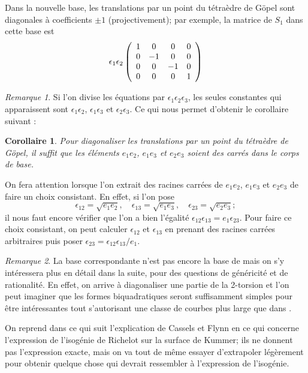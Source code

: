 \documentclass[a4paper,12pt]{article}
\newtheorem{corollaire}[theoreme]{Corollaire}
\theoremstyle{definition}
\theoremstyle{remark}
\newtheorem{remarque}{Remarque}
\numberwithin{equation}{section}
\begin{document}
Dans la nouvelle base, les translations par un point du tétraèdre de G\"opel sont diagonales à coefficients $\pm 1$ (projectivement); par exemple, la matrice de $S_1$ dans cette base est
\[ \epsilon_1\epsilon_2
\left(
  \begin{array}{ c c c c}
     1 & 0 & 0  & 0  \\
     0 & -1   & 0  & 0  \\
     0 & 0   & -1  & 0 \\
     0 & 0   & 0  & 1  \\
  \end{array} \right)
\]

\begin{remarque}
Si l'on divise les équations par $\epsilon_1\epsilon_2\epsilon_3$, les seules constantes qui apparaissent sont $\epsilon_1\epsilon_2$, $\epsilon_1\epsilon_3$ et $\epsilon_2\epsilon_3$. Ce qui nous permet d'obtenir le corollaire suivant :
\end{remarque}

\begin{corollaire}
Pour diagonaliser les translations par un point du tétraèdre de G\"opel, il suffit que les éléments $e_1e_2$, $e_1e_3$ et $e_2e_3$ soient des carrés dans le corps de base.
\end{corollaire}

On fera attention lorsque l'on extrait des racines carrées de $e_1e_2$, $e_1e_3$ et $e_2e_3$ de faire un choix consistant. En effet, si l'on pose
$$\epsilon_{12} = \sqrt{e_1e_2}, \quad \epsilon_{13} = \sqrt{e_1e_3}, \quad \epsilon_{23} = \sqrt{e_2e_3};$$
il nous faut encore vérifier que l'on a bien l'égalité $\epsilon_{12}\epsilon_{13} = e_1\epsilon_{23}$.
Pour faire ce choix consistant, on peut calculer $\epsilon_{12}$ et $\epsilon_{13}$ en prenant des racines carrées arbitraires puis poser $\epsilon_{23} = \epsilon_{12}\epsilon_{13}/e_1$.

\begin{remarque}
La base correspondante n'est pas encore la base de \citep{gaudry} mais on s'y intéressera plus en détail dans la suite, pour des questions de généricité et de rationalité. En effet, on arrive à diagonaliser une partie de la 2-torsion et l'on peut imaginer que les formes biquadratiques seront suffisamment simples pour être intéressantes tout s'autorisant une classe de courbes plus large que dans \citep{gaudry}.
\end{remarque}

On reprend dans ce qui suit l'explication de Cassels et Flynn en ce qui concerne l'expression de l'isogénie de Richelot sur la surface de Kummer; ils ne donnent pas l'expression exacte, mais on va tout de même essayer d'extrapoler légèrement pour obtenir quelque chose qui devrait ressembler à l'expression de l'isogénie.
\end{document}
